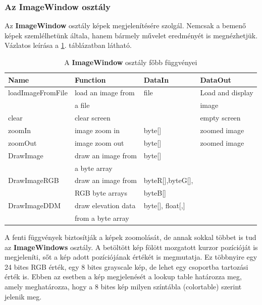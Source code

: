 \documentclass[a4paper,12pt]{article}
\begin{document}
\subsubsection{Az \textbf{ImageWindow} osztály}

Az \textbf{ImageWindow} osztály képek megjelenítésére szolgál. Nemcsak a bemenő képek szemlélhetünk általa, hanem bármely művelet eredményét is megnézhetjük. Vázlatos leírása a \ref{fig:ImageWindow}. táblázatban látható.


\begin{table}
	\begin{small}	
		\begin{tabular}{|l|l|l|l|}
			\hline
			\textbf{Name} & \textbf{Function} & \textbf{DataIn} & \textbf{DataOut}\\	
			\hline
			loadImageFromFile & load an image from  & file & Load and display \\
			&a file && image\\
			\hline
			clear & clear screen &  & empty screen \\
			\hline
			zoomIn & image zoom in & byte[] & zoomed image \\
			\hline
			zoomOut&image zoom out & byte[] & zoomed image \\
			\hline
			DrawImage & draw an image from & byte[]  &  \\
			&a byte array&&\\
			\hline
			DrawImageRGB & draw an image from & byteR[],byteG[], &  \\
			&RGB byte arrays&byteB[] &\\
			\hline
			DrawImageDDM & draw elevation data& byte[], float[,]  &  \\
			&from a byte array&&\\
			\hline			
		\end{tabular}
	\end{small}
	\caption{A \textbf{ImageWindow} osztály főbb függvényei}
	\label{fig:ImageWindow}
\end{table}

A fenti függvények biztosítják a képek zoomolását, de annak sokkal többet is tud az \textbf{ImageWindows} osztály. A betöltött kép fölött mozgatott kurzor pozícióját is megjeleníti, sőt a kép adott pozíciójának értékét is megmutatja. Ez többnyire egy 24 bites RGB érték, egy 8 bites grayscale kép, de lehet egy csoportba tartozási érték is. Ebben az esetben a kép megjelenését a lookup table határozza meg, amely meghatározza, hogy a 8 bites kép milyen színtábla (colortable) szerint jelenik meg.
\end{document}
